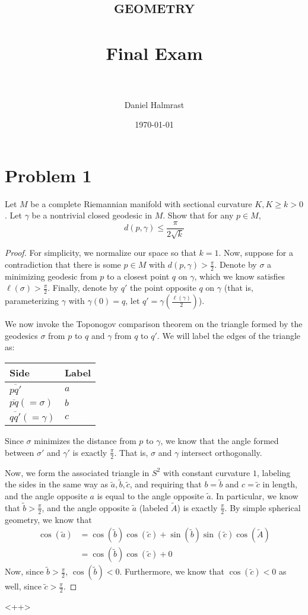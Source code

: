 \documentclass[fontsize=11pt]{scrartcl} %
\title{	
\normalfont \normalsize 
\textsc{geometry} \\ [25pt] %
\horrule{0.5pt} \\[0.4cm] %
\huge Final Exam \\ %
\horrule{2pt} \\[0.5cm] %
}
\author{Daniel Halmrast} %
\date{\normalsize\today} %
\numberwithin{equation}{section} %
\numberwithin{figure}{section} %
\numberwithin{table}{section} %
\begin{document}
\maketitle %

\section*{Problem 1}
Let $M$ be a complete Riemannian manifold with sectional curvature $K, K\geq
k>0$. Let $\gamma$ be a nontrivial closed geodesic in $M$. Show that for any
$p\in M$,
\[
    d(p,\gamma)\leq \frac{\pi}{2\sqrt{k}}
\]

\begin{proof}
    For simplicity, we normalize our space so that $k=1$. Now, suppose for a
    contradiction that there is some $p\in M$ with
    $d(p,\gamma)>\frac{\pi}{2}$. Denote by $\sigma$ a minimizing geodesic from
    $p$ to a closest point $q$ on $\gamma$, which we know satisfies
    $\ell(\sigma)>\frac{\pi}{2}$. Finally, denote by $q'$ the point opposite $q$
    on $\gamma$ (that is, parameterizing $\gamma$ with $\gamma(0)=q$, let $q' =
    \gamma(\frac{\ell(\gamma)}{2})$).

    We now invoke the Toponogov comparison theorem on the triangle formed by the
    geodesics $\sigma$ from $p$ to $q$ and $\gamma$ from $q$ to $q'$. We will
    label the edges of the triangle as:
    \begin{center}
        \begin{tabular}{l|l}
            Side & Label\\
            \hline
            $\overline{p q'}$ & $a$\\
            $\overline{p q} (=\sigma)$ & $b$\\
            $\overline{q q'}(=\gamma)$ & $c$
        \end{tabular}
    \end{center}

    Since $\sigma$ minimizes the distance from $p$ to $\gamma$, we know that the
    angle formed between $\sigma'$ and $\gamma'$ is exactly
    $\frac{\pi}{2}$. That is, $\sigma$ and $\gamma$ intersect orthogonally.

    Now, we form the associated triangle in $S^2$ with constant curvature $1$,
    labeling the sides in the same way as $\tilde{a},\tilde{b},\tilde{c}$, and
    requiring that $b = \tilde{b}$ and $c=\tilde{c}$ in length, and the angle
    opposite $a$ is equal to the angle opposite $\tilde{a}$. In
    particular, we know that $\tilde{b}>\frac{\pi}{2}$, and the angle opposite
    $\tilde{a}$ (labeled $\tilde{A}$) is exactly $\frac{\pi}{2}$. By simple
    spherical geometry, we know that
    \[
        \begin{aligned}
            \cos(\tilde{a}) &= \cos(\tilde{b})\cos(\tilde{c}) +
            \sin(\tilde{b})\sin(\tilde{c})\cos(\tilde{A})\\
            &= \cos(\tilde{b})\cos(\tilde{c}) + 0
        \end{aligned}
    \]
    Now, since $\tilde{b}>\frac{\pi}{2}$, $\cos(\tilde{b})<0$. Furthermore, we
    know that $\cos(\tilde{c})<0$ as well, since
    $\tilde{c}>\frac{\pi}{2}$.

\end{proof}<++>
\end{document}
